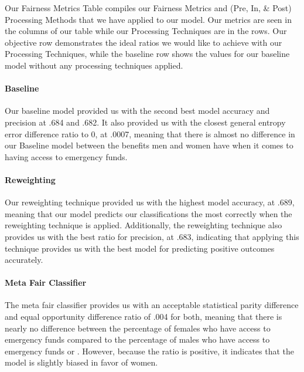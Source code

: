 \documentclass[water,article,submit,moreauthors,pdftex]{mdpi}
\begin{document}
Our Fairness Metrics Table compiles our Fairness Metrics and (Pre, In,
\& Post) Processing Methods that we have applied to our model. Our
metrics are seen in the columns of our table while our Processing
Techniques are in the rows. Our objective row demonstrates the ideal
ratios we would like to achieve with our Processing Techniques, while
the baseline row shows the values for our baseline model without any
processing techniques applied.

\hypertarget{baseline}{%
\paragraph{Baseline}\label{baseline}}

Our baseline model provided us with the second best model accuracy and
precision at .684 and .682. It also provided us with the closest general
entropy error difference ratio to 0, at .0007, meaning that there is
almost no difference in our Baseline model between the benefits men and
women have when it comes to having access to emergency funds.

\hypertarget{reweighting}{%
\paragraph{Reweighting}\label{reweighting}}

Our reweighting technique provided us with the highest model accuracy,
at .689, meaning that our model predicts our classifications the most
correctly when the reweighting technique is applied. Additionally, the
reweighting technique also provides us with the best ratio for
precision, at .683, indicating that applying this technique provides us
with the best model for predicting positive outcomes accurately.

\hypertarget{meta-fair-classifier}{%
\paragraph{Meta Fair Classifier}\label{meta-fair-classifier}}

The meta fair classifier provides us with an acceptable statistical
parity difference and equal opportunity difference ratio of .004 for
both, meaning that there is nearly no difference between the percentage
of females who have access to emergency funds compared to the percentage
of males who have access to emergency funds or . However, because the
ratio is positive, it indicates that the model is slightly biased in
favor of women.
\end{document}
